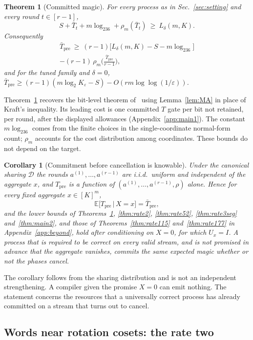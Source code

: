 \documentclass[aps,prx,twocolumn,superscriptaddress,nofootinbib,longbibliography]{revtex4-2}
\theoremstyle{plain}
\newtheorem{theorem}{Theorem}
\newtheorem{corollary}{Corollary}
\theoremstyle{definition}
\theoremstyle{remark}
\newcommand{\Tpre}{T_{\mathrm{pre}}}
\newcommand{\E}{\mathbb{E}}
\begin{document}
\begin{theorem}[Committed magic]\label{thm:main1}
For every process as in Sec.~\ref{sec:setting} and every round $t\in[r-1]$,
\begin{equation}\label{eq:main1}
S+\bar T_t+m\log_236+\rho_m(\bar T_t)\ \ge\ L_\delta(m,K).
\end{equation}
Consequently
\begin{multline}
\bar\Tpre\ \ge\ (r-1)\big[L_\delta(m,K)-S-m\log_236\big]\\-(r-1)\,\rho_m\!\Big(\frac{\bar\Tpre}{r-1}\Big),
\end{multline}
and for the tuned family and $\delta=0$, $\bar\Tpre\ge(r-1)(m\log_2K_\varepsilon-S)-O(rm\log\log(1/\varepsilon))$.
\end{theorem}
Theorem~\ref{thm:main1} recovers the bit-level theorem of~\cite{Paper1} using Lemma~\ref{lem:MA} in place of Kraft's inequality. Its leading cost is one committed $T$ gate per bit not retained, per round, after the displayed allowances (Appendix~\ref{app:main1}). The constant $m\log_236$ comes from the finite choices in the single-coordinate normal-form count; $\rho_m$ accounts for the cost distribution among coordinates. These bounds do not depend on the target.

\begin{corollary}[Commitment before cancellation is knowable]\label{cor:identity}
Under the canonical sharing $\mathcal D$ the rounds $a^{(1)},\dots,a^{(r-1)}$ are i.i.d.\ uniform and independent of the aggregate $x$, and $\Tpre$ is a function of $(a^{(1)},\dots,a^{(r-1)},\rho)$ alone. Hence for every fixed aggregate $x\in[K]^m$,
\[
\E\big[\Tpre\,\big|\,X=x\big]=\bar\Tpre ,
\]
and the lower bounds of Theorems~\ref{thm:main1}, \ref{thm:rate2}, \ref{thm:rate52}, \ref{thm:rate3seg} and~\ref{thm:main2}, and those of Theorems~\ref{thm:rate115} and~\ref{thm:rate177} in Appendix~\ref{app:beyond}, hold after conditioning on $X=0$, for which $U_x=I$. A process that is required to be correct on every valid stream, and is not promised in advance that the aggregate vanishes, commits the same expected magic whether or not the phases cancel.
\end{corollary}
The corollary follows from the sharing distribution and is not an independent strengthening. A compiler given the promise $X=0$ can emit nothing. The statement concerns the resources that a universally correct process has already committed on a stream that turns out to cancel.

\subsection{Words near rotation cosets: the rate two}\label{sec:tube}
\end{document}
